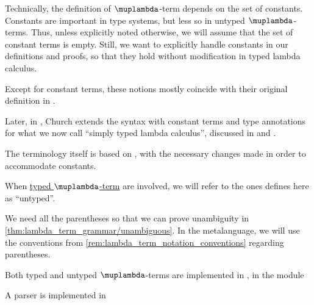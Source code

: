 \begin{comments}
  \item Technically, the definition of \( \muplambda \)-term depends on the set of constants. Constants are important in type systems, but less so in untyped \( \muplambda \)-terms. Thus, unless explicitly noted otherwise, we will assume that the set of constant terms is empty. Still, we want to explicitly handle constants in our definitions and proofs, so that they hold without modification in typed lambda calculus.

  \item Except for constant terms, these notions mostly coincide with their original definition in \cite[352]{Church1932LambdaCalculus}.

  Later, in \cite[56]{Church1940STT}, Church extends the syntax with constant terms and type annotations for what we now call \enquote{simply typed lambda calculus}, discussed in  and .

  The terminology itself is based on \cite[def. 1A1]{Hindley1997BasicSTT}, with the necessary changes made in order to accommodate constants.

  \item When \hyperref[def:typed_lambda_term]{typed \( \muplambda \)-term} are involved, we will refer to the ones defines here as \enquote{untyped}.

  \item We need all the parentheses so that we can prove unambiguity in \cref{thm:lambda_term_grammar/unambiguous}. In the metalanguage, we will use the conventions from \cref{rem:lambda_term_notation_conventions} regarding parentheses.

  \item Both typed and untyped \( \muplambda \)-terms are implemented in \cite{notebook:code}, in the module
  \begin{CodeRefDisplay}
  \end{CodeRefDisplay}

  A parser is implemented in
  \begin{CodeRefDisplay}
  \end{CodeRefDisplay}
\end{comments}

